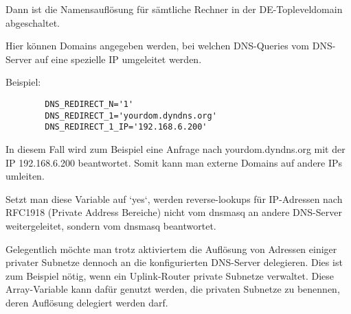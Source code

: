 \begin{description}
{      Dann ist die Namensauflösung für sämtliche Rechner in der
      DE-Topleveldomain abgeschaltet.}



    {Hier können Domains angegeben werden, bei welchen DNS-Queries vom
      DNS-Server auf eine spezielle IP umgeleitet werden.

      Beispiel:

\begin{example}
\begin{verbatim}
        DNS_REDIRECT_N='1'
        DNS_REDIRECT_1='yourdom.dyndns.org'
        DNS_REDIRECT_1_IP='192.168.6.200'
\end{verbatim}
\end{example}

      In diesem Fall wird zum Beispiel eine Anfrage nach yourdom.dyndns.org
      mit der IP 192.168.6.200 beantwortet. Somit kann man externe Domains
      auf andere IPs umleiten.}



     {Setzt man diese Variable auf `yes`, werden reverse-lookups für IP-Adressen
      nach RFC1918 (Private Address Bereiche) nicht vom dnsmasq an andere DNS-Server
      weitergeleitet, sondern vom dnsmasq beantwortet.}


     {Gelegentlich möchte man trotz aktiviertem  die
     Auflösung von Adressen einiger privater Subnetze dennoch an die
     konfigurierten DNS-Server delegieren. Dies ist zum Beispiel nötig, wenn
     ein Uplink-Router private Subnetze verwaltet. Diese Array-Variable kann
     dafür genutzt werden, die privaten Subnetze zu benennen, deren Auflösung
     delegiert werden darf.}



\end{description}
